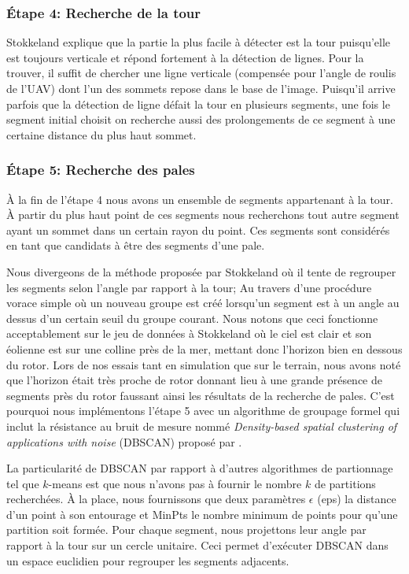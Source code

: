 \subsubsection{Étape 4: Recherche de la tour}
\label{subsubsec:approach4}

Stokkeland explique que la partie la plus facile à détecter est la tour puisqu'elle est toujours verticale et répond fortement à la détection de lignes. Pour la trouver, il suffit de chercher une ligne verticale (compensée pour l'angle de roulis de l'UAV) dont l'un des sommets repose dans le base de l'image. Puisqu'il arrive parfois que la détection de ligne défait la tour en plusieurs segments, une fois le segment initial choisit on recherche aussi des prolongements de ce segment à une certaine distance du plus haut sommet.

\subsubsection{Étape 5: Recherche des pales}

À la fin de l'étape 4 nous avons un ensemble de segments appartenant à la tour. À partir du plus haut point de ces segments nous recherchons tout autre segment ayant un sommet dans un certain rayon du point. Ces segments sont considérés en tant que candidats à être des segments d'une pale.

Nous divergeons de la méthode proposée par Stokkeland où il tente de regrouper les segments selon l'angle par rapport à la tour; Au travers d'une procédure vorace simple où un nouveau groupe est créé lorsqu'un segment est à un angle au dessus d'un certain seuil du groupe courant. Nous notons que ceci fonctionne acceptablement sur le jeu de données à Stokkeland où le ciel est clair et son éolienne est sur une colline près de la mer, mettant donc l'horizon bien en dessous du rotor. Lors de nos essais tant en simulation que sur le terrain, nous avons noté que l'horizon était très proche de rotor donnant lieu à une grande présence de segments près du rotor faussant ainsi les résultats de la recherche de pales. C'est pourquoi nous implémentons l'étape 5 avec un algorithme de groupage formel qui inclut la résistance au bruit de mesure nommé \textit{Density-based spatial clustering of applications with noise} (DBSCAN) proposé par \citep{Ester1996}.

La particularité de DBSCAN par rapport à d'autres algorithmes de partionnage tel que $k$-means est que nous n'avons pas à fournir le nombre $k$ de partitions recherchées. À la place, nous fournissons que deux paramètres $\epsilon$ (eps) la distance d'un point à son entourage et MinPts le nombre minimum de points pour qu'une partition soit formée. Pour chaque segment, nous projettons leur angle par rapport à la tour sur un cercle unitaire. Ceci permet d'exécuter DBSCAN dans un espace euclidien pour regrouper les segments adjacents.

